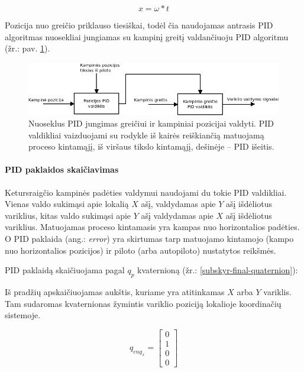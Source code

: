 \documentclass[12pt, a4paper, lithuanian, final]{article}
\begin{document}
\begin{equation}
	x =  \omega * t
\end{equation}

Pozicija nuo greičio priklauso tiesiškai, todėl čia naudojamas antrasis PID algoritmas nuosekliai jungiamas su kampinį greitį valdančiuoju PID algoritmu (žr.: pav. \ref{pav-PID-series}).

\begin{figure}[H]
\begin{center}
\includegraphics[width=1.0\textwidth]{img/PID-chaining.png}
\caption{Nuoseklus PID jungimas greičiui ir kampiniai pozicijai valdyti. PID valdikliai vaizduojami su rodykle iš kairės reiškiančią matuojamą proceso kintamąjį, iš viršaus tikslo kintamąjį, dešinėje -- PID išeitis.}
\label{pav-PID-series}
\end{center}
\end{figure}


\paragraph{PID paklaidos skaičiavimas}
Ketursraigčio kampinės padėties valdymui naudojami du tokie PID valdikliai.
Vienas valdo sukimąsi apie lokalią $X$ ašį, valdydamas apie $Y$ ašį išdėliotus variklius, kitas valdo sukimąsi apie $Y$ ašį valdydamas apie $X$ ašį išdėliotus variklius.
Matuojamas proceso kintamasis yra kampas nuo horizontalios padėties.
O PID paklaida (ang.: \textit{error}) yra skirtumas tarp matuojamo kintamojo (kampo nuo horizontalios pozicijos) ir piloto (arba autopiloto) nustatytos reikšmės.

PID paklaidą skaičiuojama pagal $q_p$ kvaternioną (žr.: \ref{subskyr-final-quaternion}):

Iš pradžių apskaičiuojamas aukštis, kuriame yra atitinkamas $X$ arba $Y$ variklis.
Tam sudaromas kvaternionas žymintis variklio poziciją lokalioje koordinačių sistemoje.

\begin{equation}
	q_{eng_x} = \left[
		\begin{array}{c}
			0 \\
			1 \\
			0 \\
			0
		\end{array}
	\right]
\end{equation}
\end{document}

